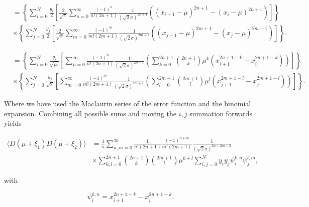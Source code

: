 \documentclass[apj]{emulateapj}
\begin{document}
\begin{equation}
\begin{aligned}
&= \left\{ \sum_{i=0}^N  \frac{y_i}{2} \left[ \frac{2}{\sqrt{\pi}} \sum_{n = 0}^\infty \frac{(-1)^n}{n! (2n+1)} \frac{1}{(\sqrt{2}\sigma)^{2n+1}} \left( (x_{i+1}-\mu)^{2n+1} - (x_{i}-\mu)^{2n+1} \right) \right] \right\} \\
&\times \left\{ \sum_{j=0}^N  \frac{y_j}{2} \left[ \frac{2}{\sqrt{\pi}} \sum_{m = 0}^\infty \frac{(-1)^m}{m! (2m+1)} \frac{1}{(\sqrt{2}\sigma)^{2m+1}} \left( (x_{j+1}-\mu)^{2m+1} - (x_{j}-\mu)^{2m+1} \right) \right] \right\}.
\end{aligned}
\end{equation}

\begin{equation}
\begin{aligned}
&= \left\{ \sum_{i=0}^N  \frac{y_i}{\sqrt{pi}} \left[ \sum_{n = 0}^\infty \frac{(-1)^n}{n! (2n+1)} \frac{1}{(\sqrt{2}\sigma)^{2n+1}} \left( \sum_{k=0}^{2n+1} {2n+1 \choose k} \mu^k ( x_{i+1}^{2n+1-k} - x_{i}^{2n+1-k} ) \right) \right] \right\} \\
&\times \left\{ \sum_{j=0}^N  \frac{y_j}{\sqrt{2}} \left[ \sum_{m = 0}^\infty \frac{(-1)^m}{m! (2m+1)} \frac{1}{(\sqrt{2}\sigma)^{2m+1}} \left( \sum_{l=0}^{2m+1} {2m+1 \choose l} \mu^l ( x_{j+1}^{2m+1-l} - x_{j}^{2m+1-l} ) \right) \right] \right\}.
\end{aligned}
\end{equation}

Where we have used the Maclaurin series of the error function and the binomial expansion. Combining all possible sums and moving the $i, j$ summation forwards yields

\begin{equation} \label{eq:dcompleteklsum}
\begin{aligned}
\langle D(\mu + \xi_1) D(\mu + \xi_2) \rangle &=  \frac{1}{\pi} \sum_{n,m = 0}^\infty \frac{1}{n! (2n+1)} \frac{(-1)^{n+m}}{m! (2m+1)} \frac{1}{(\sqrt{2}\sigma)^{2n+2m+2}} \\
&\times \sum_{k, l = 0}^{2n+1} {2n+1 \choose k} {2m+1 \choose l} \mu^{k+l} \sum_{i,j=0}^N y_i y_j \psi^{k, n}_i \psi^{l, m}_j,
\end{aligned}
\end{equation}

with

\begin{equation}
\psi_i^{k,n} = x_{i+1}^{2n+1-k} - x_{i}^{2n+1-k}.
\end{equation}
\end{document}
